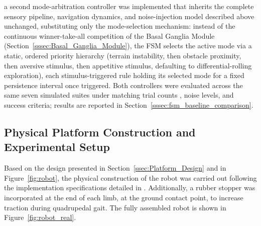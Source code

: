  a second mode-arbitration controller was implemented that inherits the complete sensory pipeline, navigation dynamics, and noise-injection model described above unchanged, substituting only the mode-selection mechanism: instead of the continuous winner-take-all competition of the Basal Ganglia Module (Section~\ref{sssec:Basal_Ganglia_Module}), the FSM selects the active mode via a static, ordered priority hierarchy (terrain instability, then obstacle proximity, then aversive stimulus, then appetitive stimulus, defaulting to differential-rolling exploration), each stimulus-triggered rule holding its selected mode for a fixed persistence interval once triggered.  Both controllers were evaluated across the same seven simulated suites under matching trial counts , noise levels, and success criteria; results are reported in Section~\ref{sssec:fsm_baseline_comparison}.

\FloatBarrier

\subsection{Physical Platform Construction and Experimental Setup}
\label{ssec:Construction}

Based on the design presented in Section~\ref{ssec:Platform_Design} and in Figure~\ref{fig:robot}, the physical construction of the robot was carried out following the implementation specifications detailed in \citep{Grajales_Des_2025}.  Additionally, a rubber stopper was incorporated at the end of each limb, at the ground contact point, to increase traction during quadrupedal gait. The fully assembled robot is shown in Figure~\ref{fig:robot_real}.

